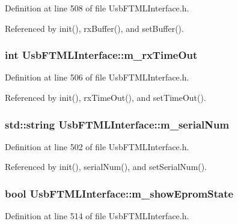 Definition at line 508 of file UsbFTMLInterface.h.

Referenced by init(), rxBuffer(), and setBuffer().\hypertarget{classUsbFTMLInterface_a4e3a413912cb5f61b5885c0d22e6c179}{
\subsubsection[{m\_\-rxTimeOut}]{\setlength{\rightskip}{0pt plus 5cm}int {\bf UsbFTMLInterface::m\_\-rxTimeOut}}}
\label{classUsbFTMLInterface_a4e3a413912cb5f61b5885c0d22e6c179}


Definition at line 506 of file UsbFTMLInterface.h.

Referenced by init(), rxTimeOut(), and setTimeOut().\hypertarget{classUsbFTMLInterface_a389d847226de3203f7331ab8509c442c}{
\subsubsection[{m\_\-serialNum}]{\setlength{\rightskip}{0pt plus 5cm}std::string {\bf UsbFTMLInterface::m\_\-serialNum}}}
\label{classUsbFTMLInterface_a389d847226de3203f7331ab8509c442c}


Definition at line 502 of file UsbFTMLInterface.h.

Referenced by init(), serialNum(), and setSerialNum().\hypertarget{classUsbFTMLInterface_ac9505aba2e8a9fd9de9aed880a56a650}{
\subsubsection[{m\_\-showEpromState}]{\setlength{\rightskip}{0pt plus 5cm}bool {\bf UsbFTMLInterface::m\_\-showEpromState}}}
\label{classUsbFTMLInterface_ac9505aba2e8a9fd9de9aed880a56a650}


Definition at line 514 of file UsbFTMLInterface.h.

